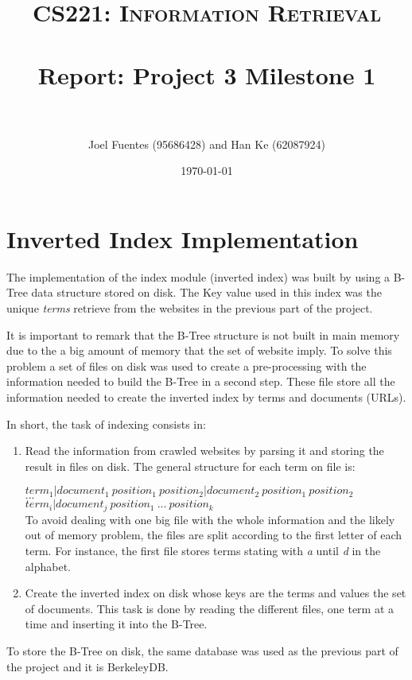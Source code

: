 \documentclass[paper=a4, fontsize=11pt]{scrartcl} %
\title{	
\normalfont \normalsize 
\textsc{CS221: Information Retrieval} \\ [25pt] %
\horrule{0.5pt} \\[0.4cm] %
\huge Report: Project 3 Milestone 1 \\ %
\horrule{2pt} \\[0.5cm] %
}
\author{Joel Fuentes (95686428)  and Han Ke (62087924)} %
\date{\normalsize\today} %
\numberwithin{equation}{section} %
\numberwithin{table}{section} %
\begin{document}
\maketitle 

\section*{Inverted Index Implementation}
The implementation of the index module (inverted index) was built by using a B-Tree data structure stored on disk. The Key value used in this index was the unique \textit{terms} retrieve from the websites in the previous part of the project.

It is important to remark that the B-Tree structure is not built in main memory due to the a big amount of memory that the set of website imply. To solve this problem a set of files on disk was used to create a pre-processing with the information needed to build the B-Tree in a second step. These file store all the information needed to create the inverted index by terms and documents (URLs). 

In short, the task of indexing consists in:
\begin{enumerate}
\item Read the information from crawled websites by parsing it and storing the result in files on disk. The general structure for each term on file is:

$term_1|document_1 \ position_1 \ position_2|document_2 \ position_1 \ position_2$\\
$...$\\
$term_i|document_j \ position_1 \ ... \ position_k$  \\
To avoid dealing with one big file with the whole information and the likely out of memory problem, the files are split according to the first letter of each term. For instance, the first file stores terms stating with \textit{a} until \textit{d} in the alphabet.
\item Create the inverted index on disk whose keys are the terms and values the set of documents. This task is done by reading the different files, one term at a time and inserting it into the B-Tree.
\end{enumerate}   
To store the B-Tree on disk, the same database was used as the previous part of the project and it is BerkeleyDB.
\end{document}

